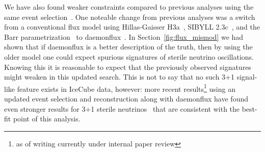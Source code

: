\documentclass[main.tex]{subfiles}
\begin{document}
We have also found weaker constraints compared to previous analyses using the same event selection~\cite{Aartsen_2020, Aartsen_2020_prd}.
One noteable change from previous analyses was a switch from a conventional flux model using Hillas-Gaisser H3a~\cite{GAISSER2012801}, SIBYLL 2.3c~\cite{Riehn:2017mfm}, and the Barr parametrization~\cite{PhysRevD.74.094009} to daemonflux~\cite{yanez2023daemonflux}.
In Section~\ref{fig:flux_mismod} we had shown that if daemonflux is a better description of the truth, then by using the older model one could expect spurious signatures of sterile neutrino oscillations. 
Knowing this it is reasonable to expect that the previously observed signatures might weaken in this updated search. 
This is not to say that no such 3+1 signal-like feature exists in IceCube data, however: more recent results\footnote{as of writing currently under internal paper review} using an updated event selection and reconstruction along with daemonflux have found even stronger results for 3+1 sterile neutrinos~\cite{alfonso_slides} that are consistent with the best-fit point of this analysis.

\end{document}
